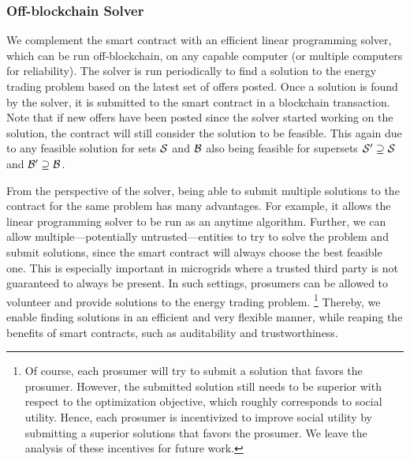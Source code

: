 
\subsubsection{Off-blockchain Solver}

We complement the smart contract with an efficient linear programming solver, which can be run off-blockchain, on any capable computer (or multiple computers for reliability).
The solver is run periodically to find a solution to the energy trading problem based on the latest set of offers posted. 
Once a solution is found by the solver, it is submitted to the smart contract in a blockchain transaction.
Note that if new offers have been posted since the solver started working on the solution, the contract will still consider the solution to be feasible. 
This again due to any feasible solution for sets $\mathcal{S}$ and $\mathcal{B}$ also being feasible for supersets $\mathcal{S}' \supseteq \mathcal{S}$ and $\mathcal{B}' \supseteq \mathcal{B}$.

From the perspective of the solver, being able to submit multiple solutions to the contract for the same problem has many advantages. %
For example, it allows the linear programming solver to be run as an anytime algorithm.
Further, we can allow multiple---potentially untrusted---entities to try to solve the problem and submit solutions, since the smart contract will always choose the best feasible one.
This is especially important in microgrids where a trusted third party is not guaranteed to always be present.
In such settings, prosumers can be allowed to volunteer and provide solutions to the energy trading problem.%
\footnote{Of course, each prosumer will try to submit a solution that favors the prosumer. However, the submitted solution still needs to be superior with respect to the optimization objective, which roughly corresponds to social utility. Hence, each prosumer is incentivized to improve social utility by submitting a superior solutions that favors the prosumer. We leave the analysis of these incentives for future work.}
Thereby, we enable finding solutions in an efficient and very flexible manner, while reaping the benefits of smart contracts, such as auditability and trustworthiness.

